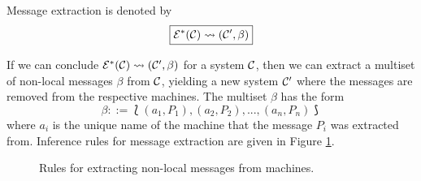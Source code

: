 Message extraction is denoted by
\begin{equation*}
\boxed{\mathcal{E}^*(\mathcal{C}) \leadsto (\mathcal{C}', \beta)}
\end{equation*}

If we can conclude $\mathcal{E}^*(\mathcal{C}) \leadsto (\mathcal{C}', \beta)$ for a system $\mathcal{C}$, then we
can extract a multiset of non-local messages $\beta$ from $\mathcal{C}$, yielding a new
system $\mathcal{C}'$ where the messages are removed from the respective machines. The
multiset $\beta$ has the form
\begin{equation*}
 \beta ::= \Lbag (a_1, P_1), (a_2, P_2), ..., (a_n, P_n) \Rbag
\end{equation*}
where $a_i$ is the unique name of the machine that the message $P_i$ was
extracted from. Inference rules for message extraction are given in Figure
\ref{fig:rule:extract}.

\begin{figure}[!ht]
\caption{Rules for extracting non-local messages from machines.}\label{fig:rule:extract}
\end{figure}

